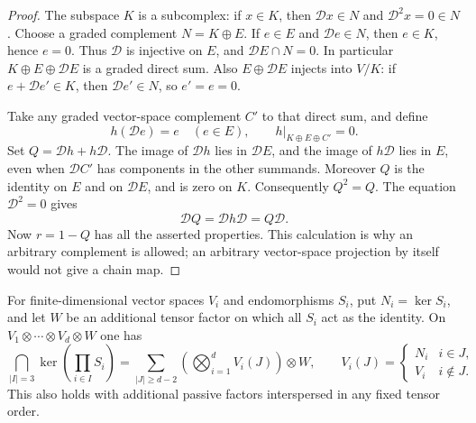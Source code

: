\begin{proof}
The subspace $K$ is a subcomplex: if $x\in K$, then
$\mathcal Dx\in N$ and $\mathcal D^2x=0\in N$.  Choose a graded
complement $N=K\oplus E$.  If $e\in E$ and $\mathcal De\in N$, then
$e\in K$, hence $e=0$.  Thus $\mathcal D$ is injective on $E$, and
$\mathcal DE\cap N=0$.  In particular $K\oplus E\oplus\mathcal DE$
is a graded direct sum.  Also $E\oplus\mathcal DE$ injects into $V/K$:
if $e+\mathcal De'\in K$, then $\mathcal De'\in N$, so $e'=e=0$.

Take any graded vector-space complement $C'$ to that direct sum, and
define
\[
 h(\mathcal De)=e\quad(e\in E),\qquad
                     h|_{K\oplus E\oplus C'}=0.
\]
Set $Q=\mathcal Dh+h\mathcal D$.  The image of $\mathcal Dh$ lies in
$\mathcal DE$, and the image of $h\mathcal D$ lies in $E$, even when
$\mathcal DC'$ has components in the other summands.  Moreover $Q$
is the identity on $E$ and on $\mathcal DE$, and is zero on $K$.
Consequently $Q^2=Q$.  The equation $\mathcal D^2=0$ gives
\[
 \mathcal DQ=\mathcal Dh\mathcal D=Q\mathcal D.
\]
Now $r=1-Q$ has all the asserted properties.  This calculation is why
an arbitrary complement is allowed; an arbitrary vector-space
projection by itself would not give a chain map.
\end{proof}

\begin{lemma}
\label{frob:tensor-kernel}
For finite-dimensional vector spaces $V_i$ and endomorphisms $S_i$,
put $N_i=\ker S_i$, and let $W$ be an additional tensor factor on which
all $S_i$ act as the identity.  On
$V_1\otimes\cdots\otimes V_d\otimes W$ one has
\begin{equation}
 \bigcap_{|I|=3}\ker\left(\prod_{i\in I}S_i\right)
 =\sum_{|J|\geq d-2}
   \left(\bigotimes_{i=1}^d V_i(J)\right)\otimes W,
 \qquad
 V_i(J)=\begin{cases}N_i&i\in J,\\ V_i&i\notin J.\end{cases}
 \label{frob:tensor-kernel-identity}
\end{equation}
This also holds with additional passive factors interspersed in any
fixed tensor order.
\end{lemma}

